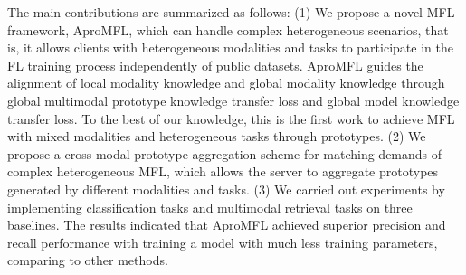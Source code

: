 The main contributions are summarized as follows: 
(1) We propose a novel MFL framework, AproMFL, which can handle complex heterogeneous scenarios, that is, it allows clients with heterogeneous modalities and tasks to participate in the FL training process independently of public datasets. 
AproMFL guides the alignment of local modality knowledge and global modality knowledge through global multimodal prototype knowledge transfer loss and global model knowledge transfer loss. 
To the best of our knowledge, this is the first work to achieve MFL with mixed modalities and heterogeneous tasks through prototypes.
(2) We propose a cross-modal prototype aggregation scheme for matching demands of complex heterogeneous MFL, which allows the server to aggregate prototypes generated by different modalities and tasks.
(3) We carried out experiments by implementing classification tasks and multimodal retrieval tasks on three baselines. 
The results indicated that AproMFL achieved superior precision and recall performance with training a model with much less training parameters, comparing to other methods. 
